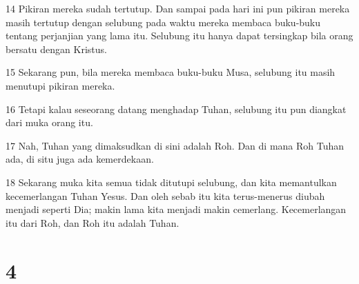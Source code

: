 \par 14 Pikiran mereka sudah tertutup. Dan sampai pada hari ini pun pikiran mereka masih tertutup dengan selubung pada waktu mereka membaca buku-buku tentang perjanjian yang lama itu. Selubung itu hanya dapat tersingkap bila orang bersatu dengan Kristus.
\par 15 Sekarang pun, bila mereka membaca buku-buku Musa, selubung itu masih menutupi pikiran mereka.
\par 16 Tetapi kalau seseorang datang menghadap Tuhan, selubung itu pun diangkat dari muka orang itu.
\par 17 Nah, Tuhan yang dimaksudkan di sini adalah Roh. Dan di mana Roh Tuhan ada, di situ juga ada kemerdekaan.
\par 18 Sekarang muka kita semua tidak ditutupi selubung, dan kita memantulkan kecemerlangan Tuhan Yesus. Dan oleh sebab itu kita terus-menerus diubah menjadi seperti Dia; makin lama kita menjadi makin cemerlang. Kecemerlangan itu dari Roh, dan Roh itu adalah Tuhan.

\chapter{4}

